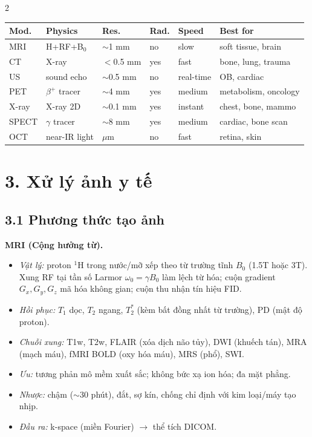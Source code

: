 \begin{paracol}{2}
\smallskip
\footnotesize
\begin{tabular}{@{}llllll@{}}
\toprule
Mod. & Physics & Res. & Rad. & Speed & Best for \\
\midrule
MRI & H+RF+B$_0$ & $\sim$1 mm & no & slow & soft tissue, brain \\
CT & X-ray & $<$0.5 mm & yes & fast & bone, lung, trauma \\
US & sound echo & $\sim$0.5 mm & no & real-time & OB, cardiac \\
PET & $\beta^+$ tracer & $\sim$4 mm & yes & medium & metabolism, oncology \\
X-ray & X-ray 2D & $\sim$0.1 mm & yes & instant & chest, bone, mammo \\
SPECT & $\gamma$ tracer & $\sim$8 mm & yes & medium & cardiac, bone scan \\
OCT & near-IR light & $\mu$m & no & fast & retina, skin \\
\bottomrule
\end{tabular}
\normalsize

\switchcolumn

\section*{3. Xử lý ảnh y tế}
\subsection*{3.1 Phương thức tạo ảnh}
\textbf{MRI (Cộng hưởng từ).}
\begin{itemize}[leftmargin=*,nosep]
  \item \emph{Vật lý:} proton $^1$H trong nước/mỡ xếp theo từ trường tĩnh $B_0$ (1.5T hoặc 3T). Xung RF tại tần số Larmor $\omega_0=\gamma B_0$ làm lệch từ hóa; cuộn gradient $G_x,G_y,G_z$ mã hóa không gian; cuộn thu nhận tín hiệu FID.
  \item \emph{Hồi phục:} $T_1$ dọc, $T_2$ ngang, $T_2^*$ (kèm bất đồng nhất từ trường), PD (mật độ proton).
  \item \emph{Chuỗi xung:} T1w, T2w, FLAIR (xóa dịch não tủy), DWI (khuếch tán), MRA (mạch máu), fMRI BOLD (oxy hóa máu), MRS (phổ), SWI.
  \item \emph{Ưu:} tương phản mô mềm xuất sắc; không bức xạ ion hóa; đa mặt phẳng.
  \item \emph{Nhược:} chậm ($\sim$30 phút), đắt, sợ kín, chống chỉ định với kim loại/máy tạo nhịp.
  \item \emph{Đầu ra:} k-space (miền Fourier) $\to$ thể tích DICOM.
\end{itemize}


\end{paracol}
